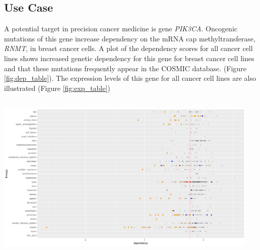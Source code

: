 \documentclass{article}
\begin{document}
\begin{multicols}{2}
\begin{minipage}[t]{\linewidth}
  
  \subsection*{\huge Use Case}
  \large
  A potential target in precision cancer medicine is gene \textit{PIK3CA}. Oncogenic mutations of this gene increase dependency on the mRNA cap methyltransferase, \textit{RNMT}, in breast cancer cells. 
  A plot of the dependency scores for all cancer cell lines shows increased genetic dependency for this gene for breast cancer cell lines and that these mutations frequently appear in the COSMIC database. (Figure \ref{fig:dep_table}).  The expression levels of this gene for all cancer cell lines are also illustrated (Figure \ref{fig:exp_table})

\end{minipage}

\noindent
\begin{minipage}[t]{\linewidth}
  \vspace{0.55cm}
  \subsection*{}
  
  
  \begin{center}
  \includegraphics[width=0.95\textwidth]{figs/new_dep.png}
  \end{center}
  \vspace{-0.5cm}
  \label{fig:dep_table}
  

\end{minipage}
\end{multicols}
\end{document}
